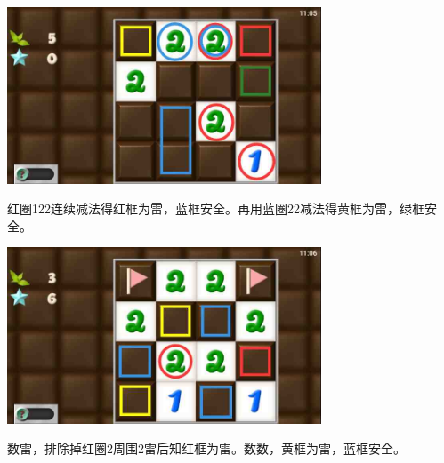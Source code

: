 \subsection{} %
\begin{center}
    \includegraphics[width=0.7\textwidth]{puzzlelow/126-1.jpg}
\end{center}
红圈122连续减法得红框为雷，蓝框安全。再用蓝圈22减法得黄框为雷，绿框安全。
\begin{center}
    \includegraphics[width=0.7\textwidth]{puzzlelow/126-2.jpg}
\end{center}
数雷，排除掉红圈2周围2雷后知红框为雷。数数，黄框为雷，蓝框安全。


